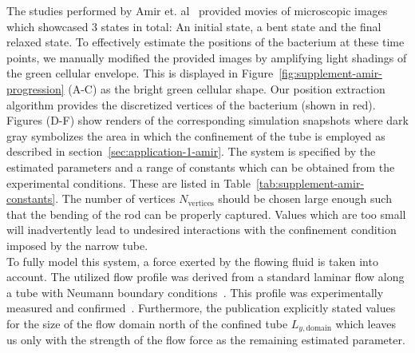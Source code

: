 The studies performed by Amir et. al~\cite{Amir2014,Amir2014_2} provided movies of microscopic
images which showcased 3 states in total:
An initial state, a bent state and the final relaxed state.
To effectively estimate the positions of the bacterium at these time points, we
manually modified
the provided images by amplifying light shadings of the green cellular envelope.
This is displayed in Figure~\ref{fig:supplement-amir-progression} (A-C) as the bright
green cellular
shape.
Our position extraction algorithm provides the discretized vertices of the bacterium
(shown in red).
Figures (D-F) show renders of the corresponding simulation snapshots where dark gray
symbolizes the
area in which the confinement of the tube is employed as described in
section~\ref{sec:application-1-amir}.
The system is specified by the estimated parameters and a range of constants which
can be obtained
from the experimental conditions.
These are listed in Table~\ref{tab:supplement-amir-constants}.
The number of vertices $N_\text{vertices}$ should be chosen large enough such that
the bending of
the rod can be properly captured.
Values which are too small will inadvertently lead to undesired interactions with the
confinement
condition imposed by the narrow tube.\\
To fully model this system, a force exerted by the flowing fluid is taken into account.
The utilized flow profile was derived from a standard laminar flow along a tube with Neumann
boundary conditions~\cite{Wolschin2021}.
This profile was experimentally measured and confirmed~\cite{Amir2014}.
Furthermore, the publication explicitly stated values for the size of the flow domain
north of the
confined tube $L_{y,\text{domain}}$ which leaves us only with the strength of the
flow force as the
remaining estimated parameter.


